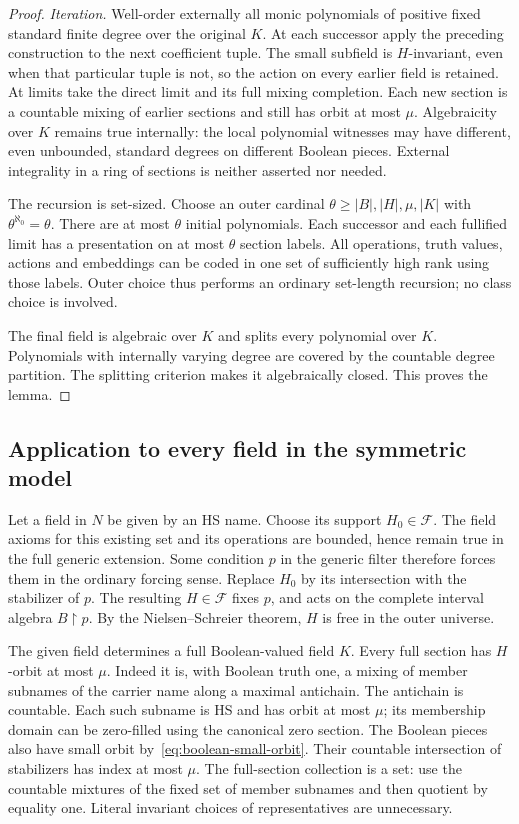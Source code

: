 \documentclass[11pt,a4paper]{article}
\theoremstyle{definition}\newtheorem{definition}[theorem]{Definition}
\theoremstyle{remark}\newtheorem{remark}[theorem]{Remark}
\begin{document}
\begin{proof}
\emph{Iteration.} Well-order externally all monic polynomials of positive fixed standard finite degree over the original $K$. At each successor apply the preceding construction to the next coefficient tuple. The small subfield is $H$-invariant, even when that particular tuple is not, so the action on every earlier field is retained. At limits take the direct limit and its full mixing completion. Each new section is a countable mixing of earlier sections and still has orbit at most $\mu$. Algebraicity over $K$ remains true internally: the local polynomial witnesses may have different, even unbounded, standard degrees on different Boolean pieces. External integrality in a ring of sections is neither asserted nor needed.

The recursion is set-sized. Choose an outer cardinal $\theta\geq|B|,|H|,\mu,|K|$ with $\theta^{\aleph_0}=\theta$. There are at most $\theta$ initial polynomials. Each successor and each fullified limit has a presentation on at most $\theta$ section labels. All operations, truth values, actions and embeddings can be coded in one set of sufficiently high rank using those labels. Outer choice thus performs an ordinary set-length recursion; no class choice is involved.

The final field is algebraic over $K$ and splits every polynomial over $K$. Polynomials with internally varying degree are covered by the countable degree partition. The splitting criterion makes it algebraically closed. This proves the lemma.
\end{proof}

\subsection{Application to every field in the symmetric model}
Let a field in $N$ be given by an HS name. Choose its support $H_0\in\mathcal F$. The field axioms for this existing set and its operations are bounded, hence remain true in the full generic extension. Some condition $p$ in the generic filter therefore forces them in the ordinary forcing sense. Replace $H_0$ by its intersection with the stabilizer of $p$. The resulting $H\in\mathcal F$ fixes $p$, and acts on the complete interval algebra $B\mathbin{\upharpoonright}p$. By the Nielsen--Schreier theorem, $H$ is free in the outer universe.

The given field determines a full Boolean-valued field $K$. Every full section has $H$-orbit at most $\mu$. Indeed it is, with Boolean truth one, a mixing of member subnames of the carrier name along a maximal antichain. The antichain is countable. Each such subname is HS and has orbit at most $\mu$; its membership domain can be zero-filled using the canonical zero section. The Boolean pieces also have small orbit by~\eqref{eq:boolean-small-orbit}. Their countable intersection of stabilizers has index at most $\mu$. The full-section collection is a set: use the countable mixtures of the fixed set of member subnames and then quotient by equality one. Literal invariant choices of representatives are unnecessary.
\end{document}
